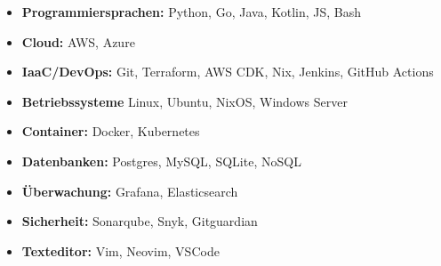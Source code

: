 \begin{itemize}[leftmargin=1.2em, itemsep=2pt]
	\item \textbf{Programmiersprachen:} Python, Go, Java, Kotlin, JS, Bash
	\item \textbf{Cloud:} AWS, Azure
	\item \textbf{IaaC/DevOps:} Git, Terraform, AWS CDK, Nix, Jenkins, GitHub Actions
	\item \textbf{Betriebssysteme} Linux, Ubuntu, NixOS, Windows Server
	\item \textbf{Container:} Docker, Kubernetes
	\item \textbf{Datenbanken:} Postgres, MySQL, SQLite, NoSQL
	\item \textbf{Überwachung:} Grafana, Elasticsearch
	\item \textbf{Sicherheit:} Sonarqube, Snyk, Gitguardian
	\item \textbf{Texteditor:} Vim, Neovim, VSCode
\end{itemize}
